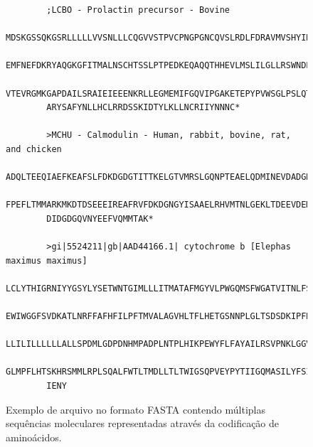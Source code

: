 \documentclass[english,brazilian]{UNISINOSmonografia} %
\newcommand\defaultFigureWidth{0.9}
\begin{document}
\begin{figure}[tb]
\centering%
\begin{minipage}{\defaultFigureWidth\textwidth}
	\caption{Exemplo de arquivo no formato FASTA contendo múltiplas sequências moleculares representadas através da codificação de aminoácidos.}
	\label{fig:arquivo-fasta}
	\begin{footnotesize}
		\begin{verbatim}
		;LCBO - Prolactin precursor - Bovine
		MDSKGSSQKGSRLLLLLVVSNLLLCQGVVSTPVCPNGPGNCQVSLRDLFDRAVMVSHYIHDLSS
		EMFNEFDKRYAQGKGFITMALNSCHTSSLPTPEDKEQAQQTHHEVLMSLILGLLRSWNDPLYHL
		VTEVRGMKGAPDAILSRAIEIEEENKRLLEGMEMIFGQVIPGAKETEPYPVWSGLPSLQTKDED
		ARYSAFYNLLHCLRRDSSKIDTYLKLLNCRIIYNNNC*
		
		>MCHU - Calmodulin - Human, rabbit, bovine, rat, and chicken
		ADQLTEEQIAEFKEAFSLFDKDGDGTITTKELGTVMRSLGQNPTEAELQDMINEVDADGNGTID
		FPEFLTMMARKMKDTDSEEEIREAFRVFDKDGNGYISAAELRHVMTNLGEKLTDEEVDEMIREA
		DIDGDGQVNYEEFVQMMTAK*
		
		>gi|5524211|gb|AAD44166.1| cytochrome b [Elephas maximus maximus]
		LCLYTHIGRNIYYGSYLYSETWNTGIMLLLITMATAFMGYVLPWGQMSFWGATVITNLFSAIPYIGTNLV
		EWIWGGFSVDKATLNRFFAFHFILPFTMVALAGVHLTFLHETGSNNPLGLTSDSDKIPFHPYYTIKDFLG
		LLILILLLLLLALLSPDMLGDPDNHMPADPLNTPLHIKPEWYFLFAYAILRSVPNKLGGVLALFLSIVIL
		GLMPFLHTSKHRSMMLRPLSQALFWTLTMDLLTLTWIGSQPVEYPYTIIGQMASILYFSIILAFLPIAGX
		IENY
		\end{verbatim}
	\end{footnotesize}
\end{minipage}
\end{figure}
\end{document}
